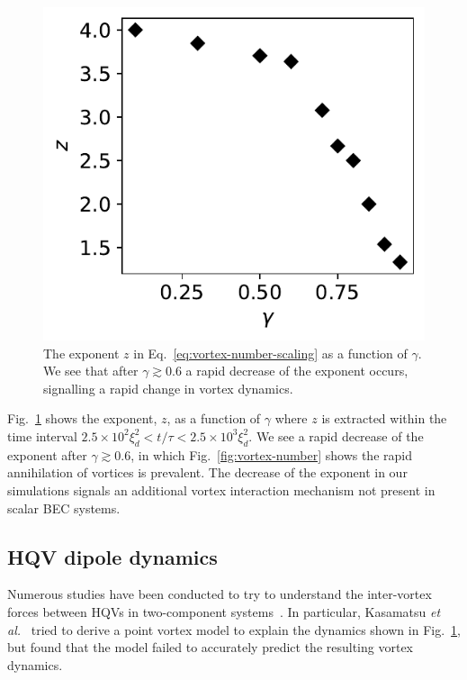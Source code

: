 \begin{figure}[t!]
    \centering
    \includegraphics{gfx/ch-twoCompDynamics/gamma_vs_expo.pdf}
    \caption{The exponent \( z \) in Eq.~\eqref{eq:vortex-number-scaling} as a
    function of \(\gamma \).
    We see that after \(\gamma \gtrsim 0.6\) a rapid decrease of the exponent
    occurs, signalling a rapid change in vortex
    dynamics.\label{fig:exponent-vs-gamma}}
\end{figure}
Fig.~\ref{fig:exponent-vs-gamma} shows the exponent, \( z \), as a function of
\(\gamma \) where \( z \) is extracted within the time interval
\(2.5 \times 10^2\xi_d^2 < t/\tau < 2.5\times10^3\xi_d^2\).
We see a rapid decrease of the exponent after \(\gamma \gtrsim 0.6\), in which
Fig.~\ref{fig:vortex-number} shows the rapid annihilation of vortices is
prevalent.
The decrease of the exponent in our simulations signals an additional vortex
interaction mechanism not present in scalar BEC systems.

\subsection{HQV dipole dynamics}
Numerous studies have been conducted to try to understand the inter-vortex
forces between HQVs in two-component systems~\cite{Eto2011, Kasamatsu2016}.
In particular, Kasamatsu \textit{et al.}~\cite{Kasamatsu2016} tried to derive a
point vortex model to explain the dynamics shown in
Fig.~\ref{fig:exponent-vs-gamma}, but found that the model failed to accurately
predict the resulting vortex dynamics.

